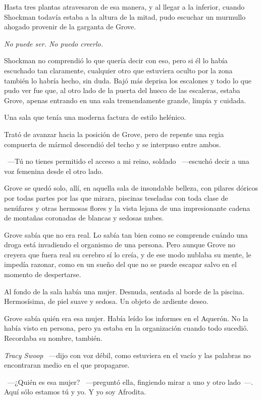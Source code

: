 Hasta tres plantas atravesaron de esa manera, y al llegar a la inferior, cuando Shockman todavía estaba a la altura de la mitad, pudo escuchar un murmullo ahogado provenir de la garganta de Grove.

\emph{No puede ser. No puedo creerlo.}

Shockman no comprendió lo que quería decir con eso, pero si él lo había escuchado tan claramente, cualquier otro que estuviera oculto por la zona también lo habría hecho, sin duda. Bajó más deprisa los escalones y todo lo que pudo ver fue que, al otro lado de la puerta del hueco de las escaleras, estaba Grove, apenas entrando en una sala tremendamente grande, limpia y cuidada.

Una sala que tenía una moderna factura de estilo helénico.

Trató de avanzar hacia la posición de Grove, pero de repente una regia compuerta de mármol descendió del techo y se interpuso entre ambos.

~---Tú no tienes permitido el acceso a mi reino, soldado ~---escuchó decir a una voz femenina desde el otro lado.

Grove se quedó solo, allí, en aquella sala de insondable belleza, con pilares dóricos por todas partes por las que mirara, piscinas teseladas con toda clase de nenúfares y otras hermosas flores y la vista lejana de una impresionante cadena de montañas coronadas de blancas y sedosas nubes.

Grove sabía que no era real. Lo sabía tan bien como se comprende cuándo una droga está invadiendo el organismo de una persona. Pero aunque Grove no creyera que fuera real su cerebro sí lo creía, y de ese modo nublaba su mente, le impedía razonar, como en un sueño del que no se puede escapar salvo en el momento de despertarse.

Al fondo de la sala había una mujer. Desnuda, sentada al borde de la piscina. Hermosísima, de piel suave y sedosa. Un objeto de ardiente deseo.

Grove sabía quién era esa mujer. Había leído los informes en el Aquerón. No la había visto en persona, pero ya estaba en la organización cuando todo sucedió. Recordaba su nombre, también.

\emph{Tracy Swoop} ~---dijo con voz débil, como estuviera en el vacío y las palabras no encontraran medio en el que propagarse.

~---¿Quién es esa mujer? ~---preguntó ella, fingiendo mirar a uno y otro lado~---. Aquí sólo estamos tú y yo. Y yo soy Afrodita.

